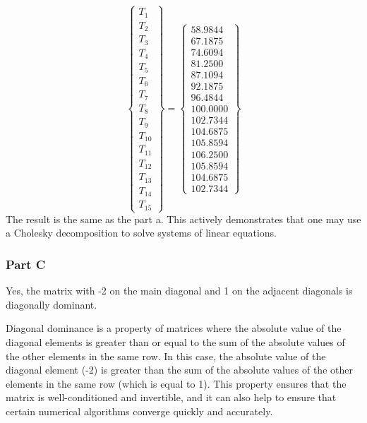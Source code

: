 \documentclass[12pt, a4paper]{article}
\begin{document}
\begin{equation}
\left\{
\begin{array}{c}
T_{1} \\
T_{2} \\
T_{3} \\
T_{4} \\
T_{5} \\
T_{6} \\
T_{7} \\
T_{8} \\
T_{9} \\
T_{10} \\
T_{11} \\
T_{12} \\
T_{13} \\
T_{14} \\
T_{15}
\end{array}
\right\}=
\left\{
\begin{array}{c}
58.9844 \\
67.1875 \\
74.6094 \\
81.2500 \\
87.1094 \\
92.1875 \\
96.4844 \\
100.0000 \\
102.7344 \\
104.6875 \\
105.8594 \\
106.2500 \\
105.8594 \\
104.6875 \\
102.7344
\end{array}
\right\}
\end{equation}
\noindent
The result is the same as the part a. This actively demonstrates that one may use a Cholesky decomposition to solve systems of linear equations.
\subsubsection{Part C}


Yes, the matrix with -2 on the main diagonal and 1 on the adjacent diagonals is diagonally dominant.

Diagonal dominance is a property of matrices where the absolute value of the diagonal elements is greater than or equal to the sum of the absolute values of the other elements in the same row. In this case, the absolute value of the diagonal element (-2) is greater than the sum of the absolute values of the other elements in the same row (which is equal to 1). This property ensures that the matrix is well-conditioned and invertible, and it can also help to ensure that certain numerical algorithms converge quickly and accurately.
\end{document}
